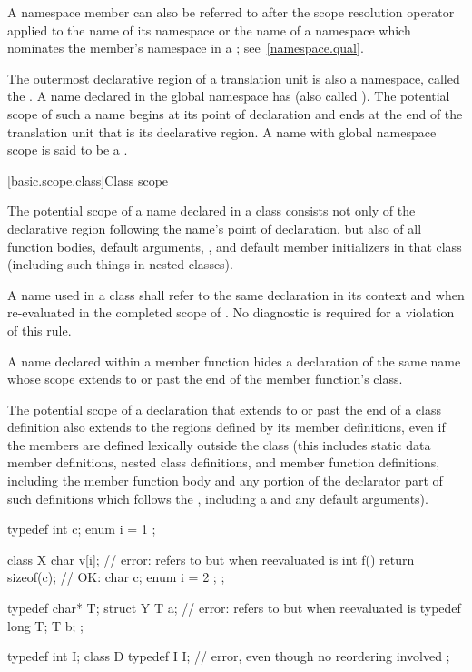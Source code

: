 \pnum
A namespace member can also be referred to after the \tcode{::} scope
resolution operator applied to the name of its
namespace or the name of a namespace which nominates the member's
namespace in a ; see~\ref{namespace.qual}.

\pnum
{}%
%
The outermost declarative region of a translation unit is also a
namespace, called the . A name declared in
the global namespace has  (also called
). The potential scope of such a name begins at
its point of declaration and ends at the end
of the translation unit that is its declarative region.
%
A name with global namespace scope is said to be a
.

[basic.scope.class]{Class scope}
%

\pnum
The potential scope of a name declared in a class consists not
only of the declarative region following the name's point of
declaration, but also of all function bodies, default arguments,
, and
default member initializers
in that class (including such
things in nested classes).

\pnum
A name  used in a class  shall refer to the same
declaration in its context and when re-evaluated in the completed scope
of . No diagnostic is required for a violation of this rule.

\pnum
A name declared within a member function hides a declaration of
the same name whose scope extends to or past the end of the member
function's class.

\pnum
The potential scope of a declaration that extends to or past the
end of a class definition also extends to the regions defined by its
member definitions, even if the members are defined lexically outside
the class (this includes static data member definitions, nested class
definitions, and member function definitions, including the member function
body and any portion of the
declarator part of such definitions which follows the ,
including a  and any default
arguments).

\pnum
\begin{example}
\begin{codeblock}
typedef int  c;
enum { i = 1 };

class X {
  char  v[i];                       // error:  refers to  but when reevaluated is 
  int  f() { return sizeof(c); }    // OK: 
  char  c;
  enum { i = 2 };
};

typedef char*  T;
struct Y {
  T  a;                             // error:  refers to  but when reevaluated is 
  typedef long  T;
  T  b;
};

typedef int I;
class D {
  typedef I I;                      // error, even though no reordering involved
};
\end{codeblock}
\end{example}

